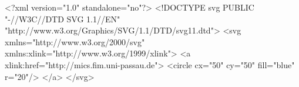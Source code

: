 <?xml version="1.0" standalone="no"?>
<!DOCTYPE svg PUBLIC "-//W3C//DTD SVG 1.1//EN" 
  "http://www.w3.org/Graphics/SVG/1.1/DTD/svg11.dtd">
<svg  xmlns="http://www.w3.org/2000/svg" 
 xmlns:xlink="http://www.w3.org/1999/xlink"> 
  <a xlink:href="http://mics.fim.uni-passau.de">
     <circle cx="50" cy="50" fill="blue" r="20"/>
  </a>
</svg>